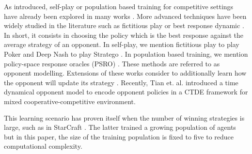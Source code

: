 As introduced, self-play or population based training for competitive settings have already been explored in many works \citep{jaderberg2019human, vinyals2019grandmaster, baker2019emergent}.
More advanced techniques have been widely studied in the literature such as fictitious play \cite{brown1951iterative} or best response dynamic \citep{baudin2022fictitious}.
In short, it consists in choosing the policy which is the best response against the average strategy of an opponent.
In self-play, we mention fictitious play to play Poker \citep{pmlr-v37-heinrich15} and Deep Nash to play Stratego \citep{DM_stratego}.
In population based training, we mention policy-space response oracles (PSRO) \citep{NIPS2017_3323fe11, Muller2020A}.
These methods are referred to as opponent modelling.
Extensions of these works consider to additionally learn how the opponent will update its strategy \citep{he2016opponent, foerster2017learning}.
Recently, Tian et. al. \citep{tian2022multi} introduced a time dynamical opponent model to encode opponent policies in a CTDE framework for mixed cooperative-competitive environment.


This learning scenario has proven itself when the number of winning strategies is large, such as in StarCraft \citep{vinyals2019grandmaster}.
The latter trained a growing population of agents but in this paper, the size of the training population is fixed to five to reduce computational complexity.

